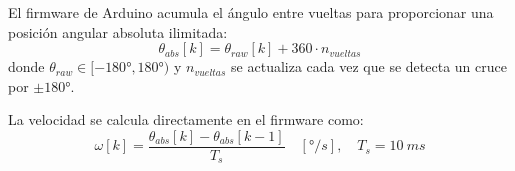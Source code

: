 \documentclass[12pt,a4paper]{article}
\begin{document}
El firmware de Arduino acumula el ángulo entre vueltas para proporcionar una
posición angular absoluta ilimitada:
\begin{equation}
  \theta_{abs}[k] = \theta_{raw}[k] + 360 \cdot n_{vueltas}
\end{equation}
donde $\theta_{raw}\in[-180°,180°)$ y $n_{vueltas}$ se actualiza cada vez que
se detecta un cruce por $\pm 180°$.

La velocidad se calcula directamente en el firmware como:
\begin{equation}
  \omega[k] = \frac{\theta_{abs}[k] - \theta_{abs}[k-1]}{T_s}
  \quad [\si{\degree/s}], \quad T_s = \SI{10}{ms}
\end{equation}
\end{document}
